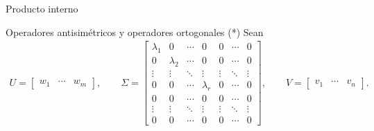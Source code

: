\documentclass[a4paper,12pt,twoside,spanish,reqno]{amsbook}
\numberwithin{equation}{section}
\theoremstyle{definition}
\theoremstyle{remark}
\renewcommand{\t}{{\operatorname{t}}}
\begin{document}
\begin{chapter}{Producto interno}
\begin{section}{Operadores antisimétricos y operadores ortogonales (*)}
        Sean
        \begin{align}
        U = \begin{bmatrix}
        w_1 & \cdots &  w_m
        \end{bmatrix},\qquad 
        \Sigma = \begin{bmatrix}
        \lambda_{1} & 0 & \cdots & 0 & 0 & \cdots & 0 \\ 
        0 & \lambda_{2} & \cdots & 0 & 0 & \cdots & 0 \\ 
        \vdots & \vdots & \ddots & \vdots & \vdots & \ddots & \vdots \\ 
        0 & 0 & \cdots & \lambda_{r} & 0 & \cdots & 0 \\  
        0 & 0 & \cdots & 0 & 0 & \cdots & 0 \\ 
        \vdots & \vdots & \ddots & \vdots & \vdots & \ddots & \vdots \\ 
        0 & 0 & \cdots & 0 & 0 & \cdots & 0 
        \end{bmatrix},\qquad
        V = \begin{bmatrix}
        v_1 & \cdots & v_n
        \end{bmatrix}. 
        \end{align}
        
        
        
        
        

\end{section}
\end{chapter}
\end{document}

